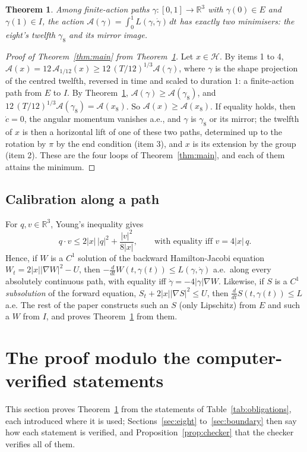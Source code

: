 \documentclass[11pt]{article}
\newtheorem{theorem}{Theorem}
\theoremstyle{definition}
\begin{document}
\begin{theorem}\label{thm:twelfth}
Among finite-action paths $\gamma:[0,1]\to\mathbb R^3$ with $\gamma(0)\in E$ and $\gamma(1)\in I$, the action
$\mathcal A(\gamma)=\int_0^1L(\gamma,\dot\gamma)\,dt$ has exactly two minimisers: the eight's twelfth $\gamma_8$ and
its mirror image.
\end{theorem}

\begin{proof}[Proof of Theorem~\ref{thm:main} from Theorem~\ref{thm:twelfth}]
Let $x\in\mathcal H$. By items 1 to 4, $\mathcal A(x)=12\,\mathcal A_{1/12}(x)\ge12\,(T/12)^{1/3}\mathcal A(\gamma)$, where
$\gamma$ is the shape projection of the centred twelfth, reversed in time and scaled to duration $1$: a finite-action
path from $E$ to $I$. By Theorem~\ref{thm:twelfth}, $\mathcal A(\gamma)\ge\mathcal A(\gamma_8)$, and
$12\,(T/12)^{1/3}\mathcal A(\gamma_8)=\mathcal A(x_8)$. So $\mathcal A(x)\ge\mathcal A(x_8)$. If equality holds, then
$\dot c=0$, the angular momentum vanishes a.e., and $\gamma$ is $\gamma_8$ or its mirror; the twelfth of $x$ is then a
horizontal lift of one of these two paths, determined up to the rotation by $\pi$ by the end condition (item 3), and
$x$ is its extension by the group (item 2). These are the four loops of Theorem~\ref{thm:main}, and each of them attains
the minimum.
\end{proof}

\subsection{Calibration along a path}
For $q,v\in\mathbb R^3$, Young's inequality gives
\begin{equation}\label{eq:young}
q\cdot v\le 2|x|\,|q|^2+\frac{|v|^2}{8|x|},\qquad\text{with equality iff } v=4|x|\,q .
\end{equation}
Hence, if $W$ is a $C^1$ solution of the backward Hamilton-Jacobi equation $W_t=2|x||\nabla W|^2-U$, then
$-\frac{d}{dt}W(t,\gamma(t))\le L(\gamma,\dot\gamma)$ a.e.\ along every absolutely continuous path, with equality
iff $\dot\gamma=-4|\gamma|\nabla W$. Likewise, if $S$ is a $C^1$ \emph{subsolution} of the forward equation,
$S_t+2|x||\nabla S|^2\le U$, then $\frac{d}{dt}S(t,\gamma(t))\le L$ a.e. The rest of the paper constructs such an $S$
(only Lipschitz) from $E$ and such a $W$ from $I$, and proves Theorem~\ref{thm:twelfth} from them.

\section{The proof modulo the computer-verified statements}\label{sec:proof}
This section proves Theorem~\ref{thm:twelfth} from the statements of Table~\ref{tab:obligations}, each introduced where
it is used; Sections~\ref{sec:eight} to~\ref{sec:boundary} then say how each statement is verified, and
Proposition~\ref{prop:checker} that the checker verifies all of them.
\end{document}
